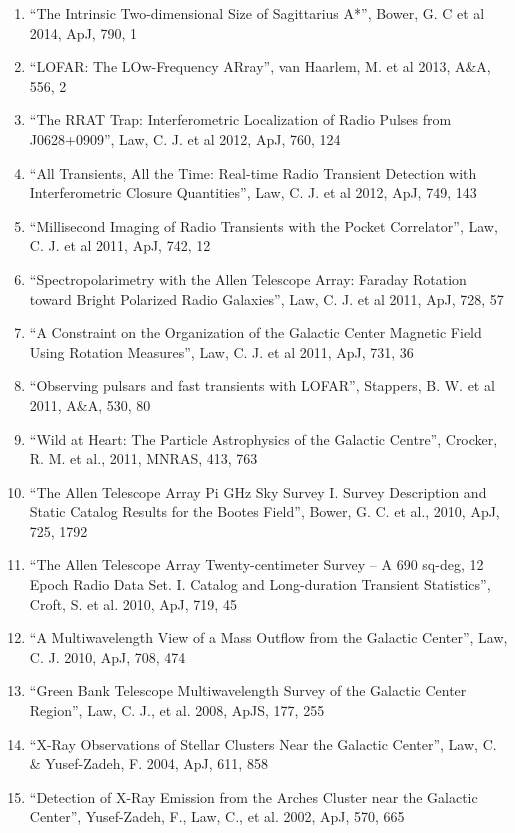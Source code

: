 \documentclass[11pt]{article}
\begin{document}
\begin{enumerate}
    \item ``The Intrinsic Two-dimensional Size of Sagittarius A*'', Bower, G. C et al 2014, ApJ, 790, 1

    \item ``LOFAR: The LOw-Frequency ARray'', van Haarlem, M. et al 2013, A\&A, 556, 2

    \item ``The RRAT Trap: Interferometric Localization of Radio Pulses from J0628+0909'', Law, C. J. et al 2012, ApJ, 760, 124

    \item ``All Transients, All the Time: Real-time Radio Transient Detection with Interferometric Closure Quantities'',  Law, C. J. et al 2012, ApJ, 749, 143

    \item ``Millisecond Imaging of Radio Transients with the Pocket Correlator'',  Law, C. J. et al 2011, ApJ, 742, 12

    \item ``Spectropolarimetry with the Allen Telescope Array:  Faraday Rotation toward Bright Polarized Radio Galaxies'',  Law, C. J. et al 2011, ApJ, 728, 57

    \item ``A Constraint on the Organization of the Galactic Center Magnetic Field Using Rotation Measures'',  Law, C. J. et al 2011, ApJ, 731, 36

    \item ``Observing pulsars and fast transients with LOFAR'',  Stappers, B. W. et al 2011, A\&A, 530, 80

    \item ``Wild at Heart: The Particle Astrophysics of the Galactic Centre'',  Crocker, R. M. et al., 2011, MNRAS, 413, 763

    \item ``The Allen Telescope Array Pi GHz Sky Survey I. Survey Description and Static Catalog Results for the Bootes Field'',  Bower, G. C. et al., 2010, ApJ, 725, 1792  

    \item ``The Allen Telescope Array Twenty-centimeter Survey -- A 690 sq-deg, 12 Epoch Radio Data Set. I. Catalog and Long-duration Transient Statistics'',  Croft, S. et al. 2010, ApJ, 719, 45

    \item ``A Multiwavelength View of a Mass Outflow from the Galactic Center'',  Law, C. J. 2010, ApJ, 708, 474

    \item ``Green Bank Telescope Multiwavelength Survey of the Galactic Center Region'',  Law, C. J., et al. 2008, ApJS, 177, 255

    \item ``X-Ray Observations of Stellar Clusters Near the Galactic Center'',  Law, C. \& Yusef-Zadeh, F. 2004, ApJ, 611, 858

    \item ``Detection of X-Ray Emission from the Arches Cluster near the Galactic Center'',  Yusef-Zadeh, F., Law, C., et al. 2002, ApJ, 570, 665
\end{enumerate}
\end{document}
